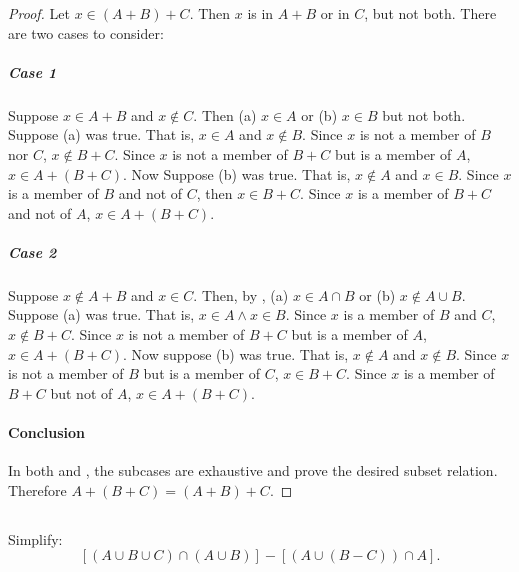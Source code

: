 \documentclass{report}
\begin{document}
\begin{proof}
    Let $x \in (A + B) + C$.
    Then $x$ is in $A + B$ or in $C$, but not both.
    There are two cases to consider:

    \subparagraph{Case 1}%

      Suppose $x \in A + B$ and $x \not\in C$.
      Then (a) $x \in A$ or (b) $x \in B$ but not both.
      Suppose (a) was true.
      That is, $x \in A$ and $x \not\in B$.
      Since $x$ is not a member of $B$ nor $C$, $x \not\in B + C$.
      Since $x$ is not a member of $B + C$ but is a member of $A$,
        $x \in A + (B + C)$.
      Now Suppose (b) was true.
      That is, $x \not\in A$ and $x \in B$.
      Since $x$ is a member of $B$ and not of $C$, then $x \in B + C$.
      Since $x$ is a member of $B + C$ and not of $A$, $x \in A + (B + C)$.

    \subparagraph{Case 2}%

      Suppose $x \not\in A + B$ and $x \in C$.
      Then, by ,
        (a) $x \in A \cap B$ or (b) $x \not\in A \cup B$.
      Suppose (a) was true.
      That is, $x \in A \land x \in B$.
      Since $x$ is a member of $B$ and $C$, $x \not\in B + C$.
      Since $x$ is not a member of $B + C$ but is a member of $A$,
        $x \in A + (B + C)$.
      Now suppose (b) was true.
      That is, $x \not\in A$ and $x \not\in B$.
      Since $x$ is not a member of $B$ but is a member of $C$, $x \in B + C$.
      Since $x$ is a member of $B + C$ but not of $A$, $x \in A + (B + C)$.

  \paragraph{Conclusion}%

    In both  and ,
      the subcases are exhaustive and prove the desired subset relation.
    Therefore $A + (B + C) = (A + B) + C$.

\end{proof}

\subsection{}%

Simplify:
  $$[(A \cup B \cup C) \cap (A \cup B)] - [(A \cup (B - C)) \cap A].$$
\end{document}
